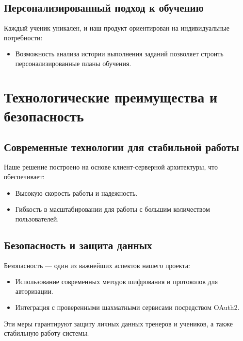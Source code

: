 \documentclass[a4paper,12pt]{article}
\begin{document}
\subsection{Персонализированный подход к обучению}
Каждый ученик уникален, и наш продукт ориентирован на индивидуальные потребности:
\begin{itemize}
    \item Возможность анализа истории выполнения заданий позволяет строить персонализированные планы обучения.
\end{itemize}

\section{Технологические преимущества и безопасность}

\subsection{Современные технологии для стабильной работы}
Наше решение построено на основе клиент-серверной архитектуры, что обеспечивает:
\begin{itemize}
    \item Высокую скорость работы и надежность.
    \item Гибкость в масштабировании для работы с большим количеством пользователей.
\end{itemize}

\subsection{Безопасность и защита данных}
Безопасность --- один из важнейших аспектов нашего проекта:
\begin{itemize}
    \item Использование современных методов шифрования и протоколов для авторизации.
    \item Интеграция с проверенными шахматными сервисами посредством OAuth2.
\end{itemize}
Эти меры гарантируют защиту личных данных тренеров и учеников, а также стабильную работу системы.

\end{document}
